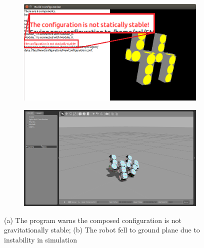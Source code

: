 \documentclass[graybox]{svmult}
\begin{document}
\begin{figure}
\begin{center}
        \begin{subfigure}[b]{0.48\columnwidth}
                \includegraphics[width=\textwidth]{images/designer_unstable.png}
                \caption{}
                \label{fig:designer_unstable}
           \end{subfigure}
        \begin{subfigure}[b]{0.48\columnwidth}
                \includegraphics[width=\textwidth]{images/gazebo_unstable2.png}
                \caption{}
                \label{fig:gazebo_unstable2}
        \end{subfigure}
\end{center}
\caption{(a) The program warns the composed configuration is not gravitationally stable; (b) The robot fell to ground plane due to instability in simulation}
\label{fig:unstable}
\end{figure}
\end{document}
